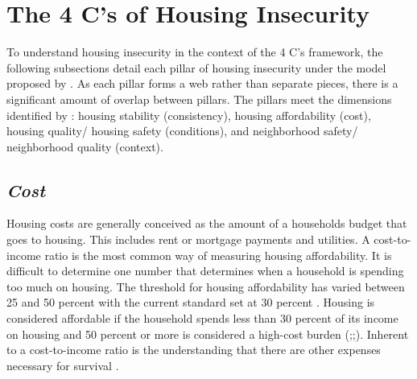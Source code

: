 \section{The 4 C's of Housing Insecurity}

To understand housing insecurity in the context of the 4 C's framework, the following subsections detail each pillar of housing insecurity under the model proposed by \citep{hernandez_housing_2019}. As each pillar forms a web rather than separate pieces, there is a significant amount of overlap between pillars. The pillars meet the dimensions identified by \citet{cox_road_2019}: housing stability (consistency), housing affordability (cost), housing quality/ housing safety (conditions), and neighborhood safety/ neighborhood quality (context). 
 
\subsection{\textit{Cost}}
Housing costs are generally conceived as the amount of a households budget that goes to housing. This includes rent or mortgage payments and utilities. A cost-to-income ratio is the most common way of measuring housing affordability. It is difficult to determine one number that determines when a household is spending too much on housing. The threshold for housing affordability has varied between 25 and 50 percent with the current standard set at 30 percent \citep{kropczynski_insights_2012}.  Housing is considered affordable if the household spends less than 30 percent of its income on housing and 50 percent or more is considered a high-cost burden (\citealp{braveman_housing_2011};\citealp{swope_housing_2020};\citealp{weicher_housing_2006}). Inherent to a cost-to-income ratio is the understanding that there are other expenses necessary for survival \citep{herbert_measuring_2018}. 
